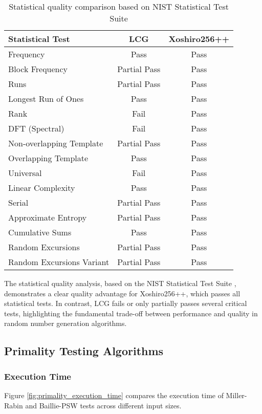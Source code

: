 \begin{table}[h]
\centering
\begin{tabular}{|l|c|c|}
\hline
\textbf{Statistical Test} & \textbf{LCG} & \textbf{Xoshiro256++} \\
\hline
Frequency & Pass & Pass \\
Block Frequency & Partial Pass & Pass \\
Runs & Partial Pass & Pass \\
Longest Run of Ones & Pass & Pass \\
Rank & Fail & Pass \\
DFT (Spectral) & Fail & Pass \\
Non-overlapping Template & Partial Pass & Pass \\
Overlapping Template & Pass & Pass \\
Universal & Fail & Pass \\
Linear Complexity & Pass & Pass \\
Serial & Partial Pass & Pass \\
Approximate Entropy & Partial Pass & Pass \\
Cumulative Sums & Pass & Pass \\
Random Excursions & Partial Pass & Pass \\
Random Excursions Variant & Partial Pass & Pass \\
\hline
\end{tabular}
\caption{Statistical quality comparison based on NIST Statistical Test Suite \cite{nist_test_suite}}
\label{tab:rng_statistical_quality}
\end{table}

The statistical quality analysis, based on the NIST Statistical Test Suite \cite{nist_test_suite}, demonstrates a clear quality advantage for Xoshiro256++, which passes all statistical tests. In contrast, LCG fails or only partially passes several critical tests, highlighting the fundamental trade-off between performance and quality in random number generation algorithms.

\subsection{Primality Testing Algorithms}

\subsubsection{Execution Time}
Figure \ref{fig:primality_execution_time} compares the execution time of Miller-Rabin and Baillie-PSW tests across different input sizes.

